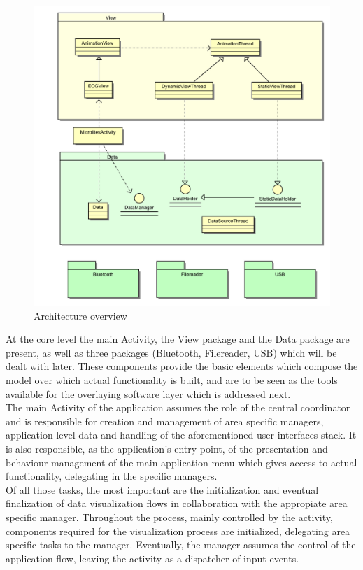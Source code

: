 		\begin{figure}[h]
		\includegraphics[scale=0.75]{mlts-arch-main}
		\centering
		\caption{Architecture overview}
		\label{fig:arch-global}
		\end{figure}

		At the core level the main Activity, the View package and the Data package are present, as well as three packages (Bluetooth, Filereader, USB) which will be dealt with later. These components provide the basic elements which compose the model over which actual functionality is built, and are to be seen as the tools available for the overlaying software layer which is addressed next.\\

		The main Activity of the application assumes the role of the central coordinator and is responsible for creation and management of area specific managers, application level data and handling of the aforementioned user interfaces stack. It is also responsible, as the application's entry point, of the presentation and behaviour management of the main application menu which gives access to actual functionality, delegating in the specific managers.\\
		
		Of all those tasks, the most important are the initialization and eventual finalization of data visualization flows in collaboration with the appropiate area specific manager. Throughout the process, mainly controlled by the activity, components required for the visualization process are initialized, delegating area specific tasks to the manager. Eventually, the manager assumes the control of the application flow, leaving the activity as a dispatcher of input events.\\

